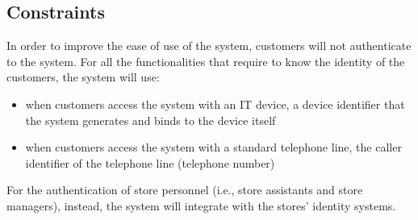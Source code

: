 \documentclass[../../main.tex]{subfiles}
\begin{document}
\subsection{Constraints}

In order to improve the ease of use of the system, customers will not authenticate to the system. For all the functionalities that require to know the identity of the customers, the system will use:


\begin{itemize}
    \item when customers access the system with an IT device, a device identifier that the system generates and binds to the device itself
    \item when customers access the system with a standard telephone line, the caller identifier of the telephone line (telephone number)
\end{itemize}

For the authentication of store personnel (i.e., store assistants and store managers), instead, the system will integrate with the stores' identity systems.
\end{document}
